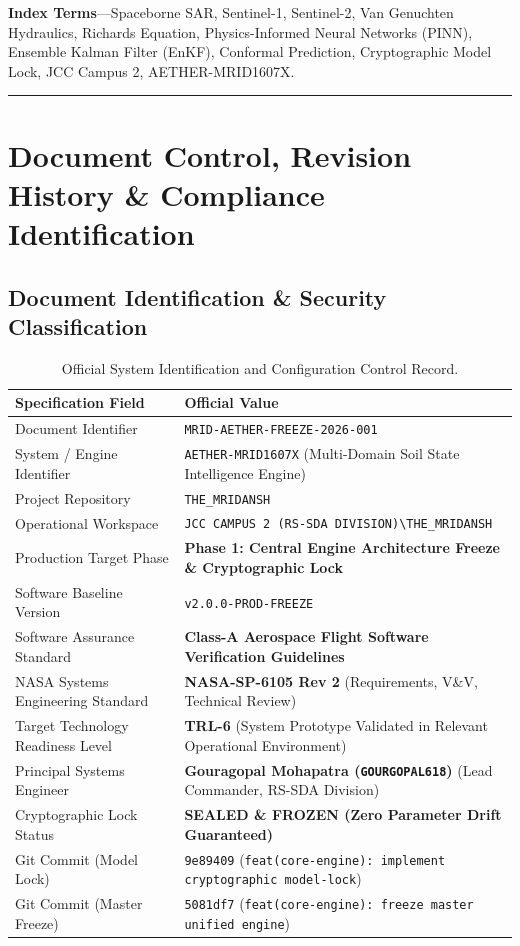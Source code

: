 \documentclass[11pt,a4paper]{article}
\theoremstyle{definition}
\theoremstyle{remark}
\begin{document}
\noindent \textbf{\small Index Terms}---Spaceborne SAR, Sentinel-1, Sentinel-2, Van Genuchten Hydraulics, Richards Equation, Physics-Informed Neural Networks (PINN), Ensemble Kalman Filter (EnKF), Conformal Prediction, Cryptographic Model Lock, JCC Campus 2, AETHER-MRID1607X.

\vspace{0.4cm}
\hrule
\vspace{0.6cm}

\section{Document Control, Revision History \& Compliance Identification}

\subsection{Document Identification \& Security Classification}
\begin{table}[h!]
\centering
\small
\begin{tabular}{ll}
\toprule
\textbf{Specification Field} & \textbf{Official Value} \\
\midrule
Document Identifier & \texttt{MRID-AETHER-FREEZE-2026-001} \\
System / Engine Identifier & \texttt{AETHER-MRID1607X} (Multi-Domain Soil State Intelligence Engine) \\
Project Repository & \texttt{THE\_MRIDANSH} \\
Operational Workspace & \texttt{JCC CAMPUS 2 (RS-SDA DIVISION)\textbackslash THE\_MRIDANSH} \\
Production Target Phase & \textbf{Phase 1: Central Engine Architecture Freeze \& Cryptographic Lock} \\
Software Baseline Version & \texttt{v2.0.0-PROD-FREEZE} \\
Software Assurance Standard & \textbf{Class-A Aerospace Flight Software Verification Guidelines} \\
NASA Systems Engineering Standard & \textbf{NASA-SP-6105 Rev 2} (Requirements, V\&V, Technical Review) \\
Target Technology Readiness Level & \textbf{TRL-6} (System Prototype Validated in Relevant Operational Environment) \\
Principal Systems Engineer & \textbf{Gouragopal Mohapatra (\texttt{GOURGOPAL618})} (Lead Commander, RS-SDA Division) \\
Cryptographic Lock Status & \textbf{SEALED \& FROZEN (Zero Parameter Drift Guaranteed)} \\
Git Commit (Model Lock) & \texttt{9e89409} (\texttt{feat(core-engine): implement cryptographic model-lock}) \\
Git Commit (Master Freeze) & \texttt{5081df7} (\texttt{feat(core-engine): freeze master unified engine}) \\
\bottomrule
\end{tabular}
\caption{Official System Identification and Configuration Control Record.}
\label{tab:system_id}
\end{table}
\end{document}
